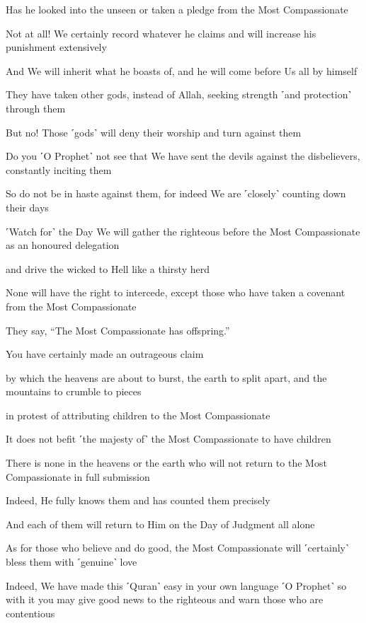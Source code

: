 Has he looked into the unseen or taken a pledge from the Most Compassionate

Not at all! We certainly record whatever he claims and will increase his punishment extensively

And We will inherit what he boasts of, and he will come before Us all by himself

They have taken other gods, instead of Allah, seeking strength ˹and protection˺ through them

But no! Those ˹gods˺ will deny their worship and turn against them

Do you ˹O Prophet˺ not see that We have sent the devils against the disbelievers, constantly inciting them

So do not be in haste against them, for indeed We are ˹closely˺ counting down their days

˹Watch for˺ the Day We will gather the righteous before the Most Compassionate as an honoured delegation

and drive the wicked to Hell like a thirsty herd

None will have the right to intercede, except those who have taken a covenant from the Most Compassionate

They say, “The Most Compassionate has offspring.”

You have certainly made an outrageous claim

by which the heavens are about to burst, the earth to split apart, and the mountains to crumble to pieces

in protest of attributing children to the Most Compassionate

It does not befit ˹the majesty of˺ the Most Compassionate to have children

There is none in the heavens or the earth who will not return to the Most Compassionate in full submission

Indeed, He fully knows them and has counted them precisely

And each of them will return to Him on the Day of Judgment all alone

As for those who believe and do good, the Most Compassionate will ˹certainly˺ bless them with ˹genuine˺ love

Indeed, We have made this ˹Quran˺ easy in your own language ˹O Prophet˺ so with it you may give good news to the righteous and warn those who are contentious

